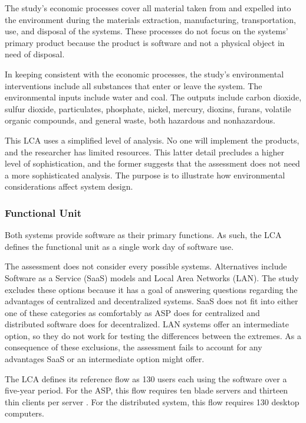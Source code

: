 \documentclass[final,journal,10pt,letterpaper,oneside,twocolumn,compsoc]%
{IEEEtran}
\begin{document}
The study's economic processes cover all material taken from and expelled into
the environment during the materials extraction, manufacturing, transportation,
use, and disposal of the systems. These
processes do not focus on the systems' primary product because the product is
software and not a physical object in need of disposal.

In keeping consistent with the economic processes, the study's environmental
interventions
include all substances that enter or leave the system. The environmental inputs
include water and coal. The outputs include carbon dioxide, sulfur dioxide,
particulates, phosphate, nickel, mercury, dioxins, furans, volatile organic
compounds, and general waste, both hazardous and nonhazardous.

This LCA uses a simplified level of analysis. No one will implement the
products, and the researcher has limited resources. This latter detail precludes
a higher level of sophistication, and the former suggests that the
assessment does not need a more sophisticated analysis. The purpose is to
illustrate how environmental considerations affect system design.

\subsubsection{Functional Unit}
Both systems provide software as their primary functions.  As such, the LCA
defines the functional unit as a single work day of software use.

The assessment does not consider every possible systems. Alternatives include
Software as a Service (SaaS) models and Local Area Networks (LAN). The study
excludes
these options because it has a goal of answering questions regarding the
advantages of
centralized and decentralized systems. SaaS does not fit into either one of
these categories as comfortably as ASP does for centralized and distributed
software does for decentralized. LAN systems offer an intermediate option, so
they do not work for testing the differences between the extremes. As a
consequence
of these exclusions, the assessment fails to account for any advantages SaaS or
an intermediate option might offer. 

The LCA defines its reference flow as 130 users each using
the software over a five-year period. For the ASP,
this flow requires ten blade servers and thirteen thin clients per server
\cite{client}.
For the distributed system, this flow requires 130 desktop computers.
\end{document}
